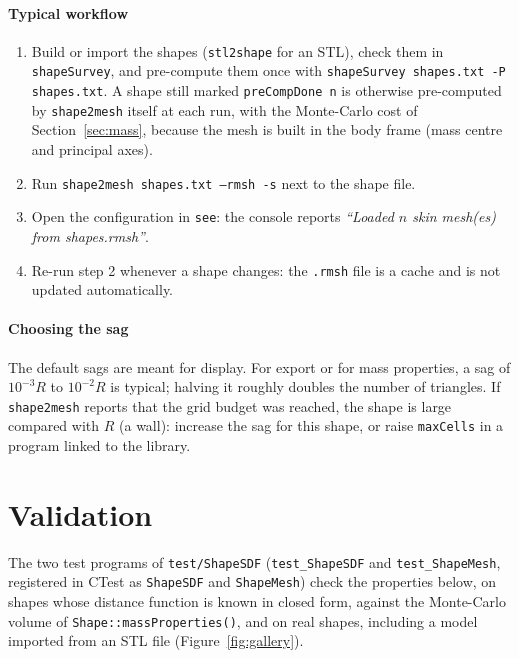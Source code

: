 \documentclass[11pt,a4paper]{article}
\newcommand{\Rmink}{R}                 %
\newcommand{\code}[1]{\texttt{#1}}
\begin{document}
\paragraph{Typical workflow}
\begin{enumerate}[nosep]
  \item Build or import the shapes (\code{stl2shape} for an STL), check them in
    \code{shapeSurvey}, and pre-compute them once with
    \code{shapeSurvey shapes.txt -P shapes.txt}. A shape still marked
    \code{preCompDone n} is otherwise pre-computed by \code{shape2mesh} itself at
    each run, with the Monte-Carlo cost of Section~\ref{sec:mass}, because the
    mesh is built in the body frame (mass centre and principal axes).
  \item Run \code{shape2mesh shapes.txt --rmsh -s} next to the shape file.
  \item Open the configuration in \code{see}: the console reports
    \emph{``Loaded $n$ skin mesh(es) from shapes.rmsh''}.
  \item Re-run step 2 whenever a shape changes: the \code{.rmsh} file is a cache and
    is not updated automatically.
\end{enumerate}

\paragraph{Choosing the sag} The default sags are meant for display. For export
or for mass properties, a sag of $10^{-3}\Rmink$ to $10^{-2}\Rmink$ is typical;
halving it roughly doubles the number of triangles. If \code{shape2mesh} reports
that the grid budget was reached, the shape is large compared with $\Rmink$ (a
wall): increase the sag for this shape, or raise \code{maxCells} in a program
linked to the library.

\section{Validation}
\label{sec:results}

The two test programs of \code{test/ShapeSDF} (\code{test\_ShapeSDF} and
\code{test\_ShapeMesh}, registered in CTest as \code{ShapeSDF} and \code{ShapeMesh})
check the properties below, on shapes whose distance function is known in closed
form, against the Monte-Carlo volume of \code{Shape::massProperties()}, and on real
shapes, including a model imported from an STL file (Figure~\ref{fig:gallery}).
\end{document}
